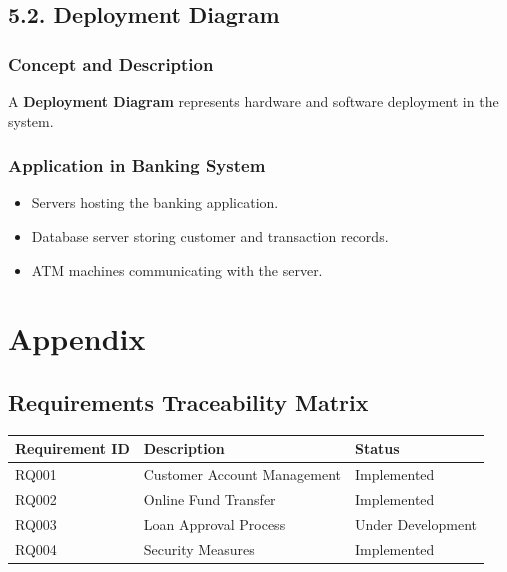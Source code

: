 \subsection{5.2. Deployment Diagram}\label{deployment-diagram}

\subsubsection{Concept and Description}\label{concept-and-description-8}

A \textbf{Deployment Diagram} represents hardware and software
deployment in the system.

\subsubsection{Application in Banking
System}\label{application-in-banking-system-8}

\begin{itemize}
\item
  Servers hosting the banking application.
\item
  Database server storing customer and transaction records.
\item
  ATM machines communicating with the server.
\end{itemize}

\section{Appendix}\label{appendix}

\subsection{Requirements Traceability
Matrix}\label{requirements-traceability-matrix}

\begin{longtable}[]{@{}
  >{\raggedright\arraybackslash}p{}
  >{\raggedright\arraybackslash}p{}
  >{\raggedright\arraybackslash}p{}@{}}
\toprule\noalign{}
\begin{minipage}[b]{\linewidth}\raggedright
Requirement ID
\end{minipage} & \begin{minipage}[b]{\linewidth}\raggedright
Description
\end{minipage} & \begin{minipage}[b]{\linewidth}\raggedright
Status
\end{minipage} \\
\midrule\noalign{}
\endhead
\bottomrule\noalign{}
\endlastfoot
RQ001 & Customer Account Management & Implemented \\
RQ002 & Online Fund Transfer & Implemented \\
RQ003 & Loan Approval Process & Under Development \\
RQ004 & Security Measures & Implemented \\
\end{longtable}

